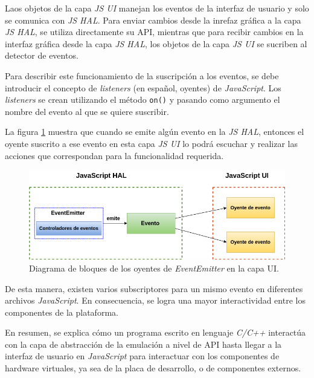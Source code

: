 Laos objetos de la capa \textit{JS UI} manejan los eventos de la interfaz de usuario y solo se comunica con \textit{JS HAL}. Para enviar cambios desde la inrefaz gráfica a la capa \textit{JS HAL}, se utiliza directamente su API, mientras que para recibir cambios en la interfaz gráfica desde la capa \textit{JS HAL}, los objetos de la capa \textit{JS UI} se sucriben al detector de eventos. 

Para describir este funcionamiento de la suscripción a los eventos, se debe introducir el concepto de \textit{listeners} (en español, oyentes) de \textit{JavaScript}. Los \textit{listeners} se crean utilizando el método \texttt{on()} y pasando como argumento el nombre del evento al que se quiere suscribir. 

La figura \ref{fig:EventemitterNodeJSUI} muestra que cuando se emite algún evento en la \textit{JS HAL}, entonces el oyente suscrito a ese evento en esta capa \textit{JS UI} lo podrá escuchar y realizar las acciones que correspondan para la funcionalidad requerida. 

\begin{figure}[ht]
	\centering
	\includegraphics[scale=.52]{./Figures/EventemitterNodeJSUI.png}
	\caption{Diagrama de bloques de los oyentes de \textit{EventEmitter} en la capa UI.}
	\label{fig:EventemitterNodeJSUI}
\end{figure}

\newpage

De esta manera, existen varios subscriptores para un mismo evento en diferentes archivos \textit{JavaScript}. En consecuencia, se logra una mayor interactividad entre los componentes de la plataforma.

En resumen, se explica cómo un programa escrito en lenguaje \textit{C/C++} interactúa con la capa de abstracción de la emulación a nivel de API hasta llegar a la interfaz de usuario en \textit{JavaScript} para interactuar con los componentes de hardware virtuales, ya sea de la placa de desarrollo, o de componentes externos. 


